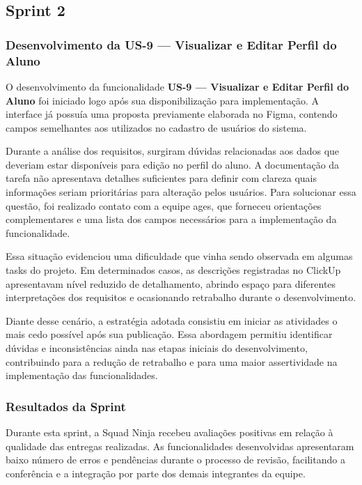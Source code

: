 \subsection{Sprint 2}

\subsubsection*{Desenvolvimento da US-9 --- Visualizar e Editar Perfil do Aluno}

O desenvolvimento da funcionalidade \textbf{US-9 --- Visualizar e Editar Perfil do Aluno}
foi iniciado logo após sua disponibilização para implementação. A interface já possuía
uma proposta previamente elaborada no Figma, contendo campos semelhantes aos
utilizados no cadastro de usuários do sistema.

Durante a análise dos requisitos, surgiram dúvidas relacionadas aos dados que deveriam
estar disponíveis para edição no perfil do aluno. A documentação da tarefa não
apresentava detalhes suficientes para definir com clareza quais informações seriam
prioritárias para alteração pelos usuários. Para solucionar essa questão, foi realizado
contato com a equipe \ac{ages}, que forneceu orientações complementares e uma lista
dos campos necessários para a implementação da funcionalidade.

Essa situação evidenciou uma dificuldade que vinha sendo observada em algumas tasks
do projeto. Em determinados casos, as descrições registradas no ClickUp apresentavam
nível reduzido de detalhamento, abrindo espaço para diferentes interpretações dos
requisitos e ocasionando retrabalho durante o desenvolvimento.

Diante desse cenário, a estratégia adotada consistiu em iniciar as atividades o mais
cedo possível após sua publicação. Essa abordagem permitiu identificar dúvidas e
inconsistências ainda nas etapas iniciais do desenvolvimento, contribuindo para a
redução de retrabalho e para uma maior assertividade na implementação das
funcionalidades.

\subsubsection*{Resultados da Sprint}

Durante esta sprint, a Squad Ninja recebeu avaliações positivas em relação à qualidade
das entregas realizadas. As funcionalidades desenvolvidas apresentaram baixo número de
erros e pendências durante o processo de revisão, facilitando a conferência e a
integração por parte dos demais integrantes da equipe.

